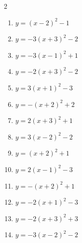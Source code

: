 \documentclass[b5paper,10pt]{ltjsarticle}
\begin{document}
\begin{multicols}{ 2 }
\begin{enumerate}
\vspace{170pt}\item $\displaystyle{} y= \left( x-2\right)^{2}-1$

\vspace{170pt}\item $\displaystyle{} y= -3\left( x+3\right)^{2}-2$

\vspace{170pt}\item $\displaystyle{} y= -3\left( x-1\right)^{2}+1$

\vspace{170pt}\item $\displaystyle{} y= -2\left( x+3\right)^{2}-2$

\vspace{170pt}\item $\displaystyle{} y= 3\left( x+1\right)^{2}-3$

\vspace{170pt}\item $\displaystyle{} y= -\left( x+2\right)^{2}+2$

\vspace{170pt}\item $\displaystyle{} y= 2\left( x+3\right)^{2}+1$

\vspace{170pt}\item $\displaystyle{} y= 3\left( x-2\right)^{2}-2$

\vspace{170pt}\item $\displaystyle{} y= \left( x+2\right)^{2}+1$

\vspace{170pt}\item $\displaystyle{} y= 2\left( x-1\right)^{2}-3$

\vspace{170pt}\item $\displaystyle{} y= -\left( x+2\right)^{2}+1$

\vspace{170pt}\item $\displaystyle{} y= -2\left( x+1\right)^{2}-3$

\vspace{170pt}\item $\displaystyle{} y= -2\left( x+3\right)^{2}+3$

\vspace{170pt}\item $\displaystyle{} y= -3\left( x-2\right)^{2}-2$


\end{enumerate}
\end{multicols}
\end{document}
